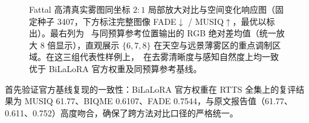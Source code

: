 \documentclass[10pt,twocolumn,letterpaper]{article}
\begin{document}
\begin{table}[t]
\centering\small\setlength{\tabcolsep}{2pt}

\caption{同预算（均选 3 块、110595 参数）位置选择规则消融实验（三种子均值$\pm$标准差）。所有规则共享同一 Conv-EVA 初始化与第 5 轮快照 $\theta_5$，随后继续微调 25 轮。门控排序因不同种子选中不同组合导致方差显著增大，而 \method~在全部三个种子下均一致收敛至 $\{6,7,8\}$。}
\label{tab:ablation}
\end{table}

\begin{table}[t]
\centering\small\setlength{\tabcolsep}{2pt}

\caption{Fattal 基准去重灵敏度验证（\method~相对同预算参考位置的三种子均值增量）。剔除验证集重合图 \texttt{flags\_input.png} 后，FADE 降幅与 BIQME、MUSIQ 增益方向保持一致。}
\label{tab:sensitivity}
\end{table}

\begin{figure}[t]
\centering
\caption{Fattal 高清真实雾图同坐标 $2:1$ 局部放大对比与空间变化响应图（固定种子 3407，下方标注完整图像 FADE$\downarrow$ / MUSIQ$\uparrow$，最优以标出）。最右列为 \method~与同预算参考位置输出的 RGB 绝对差均值（统一放大 8 倍显示），直观展示 $\{6,7,8\}$ 在天空与远景薄雾区的重点调制区域。在这三组代表性样例上，\method~在去雾清晰度与感知自然度上均一致优于 BiLaLoRA 官方权重及同预算参考基线。}
\label{fig:visual}
\end{figure}

\begin{table}[t]
\centering\small\setlength{\tabcolsep}{2pt}

\caption{评训分离机理验证与极端重雾域扩展诊断（三种子均值$\pm$标准差）。\textbf{(a)} 在 $\{5,6,8\}$ 第 30 轮起点追加 5 轮监督，对比纯 H2C 与将 MUSIQ 反馈直接引入反向传播（局部裁剪、整图 224、整图 1024）。\textbf{(b)} 主方案（5+25 轮）在 Dense-Haze 全 55 对极端重雾下的泛化表现，PSNR 与 SSIM~\cite{ssim2004} 越大越好。}
\label{tab:extension}
\end{table}

首先验证官方基线复现的一致性：BiLaLoRA 官方权重在 RTTS 全集上的复评结果为 MUSIQ 61.77、BIQME 0.6107、FADE 0.7544，与原文报告值（61.77、0.611、0.752）高度吻合，确保了跨方法对比口径的严格统一。
\end{document}

